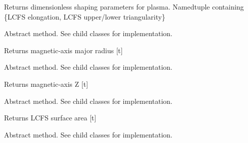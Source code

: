 \documentclass[letterpaper,10pt,english]{sphinxmanual}
\begin{document}
\begin{fulllineitems}
\begin{fulllineitems}
Returns dimensionless shaping parameters for plasma.
Namedtuple containing \{LCFS elongation, LCFS upper/lower triangularity\}

\end{fulllineitems}


\begin{fulllineitems}
\label{\detokenize{eqtools:eqtools.core.Equilibrium.getMagR}}
Abstract method.  See child classes for implementation.

Returns magnetic-axis major radius {[}t{]}

\end{fulllineitems}


\begin{fulllineitems}
\label{\detokenize{eqtools:eqtools.core.Equilibrium.getMagZ}}
Abstract method.  See child classes for implementation.

Returns magnetic-axis Z {[}t{]}

\end{fulllineitems}


\begin{fulllineitems}
\label{\detokenize{eqtools:eqtools.core.Equilibrium.getAreaLCFS}}
Abstract method.  See child classes for implementation.

Returns LCFS surface area {[}t{]}

\end{fulllineitems}


\begin{fulllineitems}
\label{\detokenize{eqtools:eqtools.core.Equilibrium.getAOut}}
Abstract method.  See child classes for implementation.


\end{fulllineitems}
\end{fulllineitems}
\end{document}
